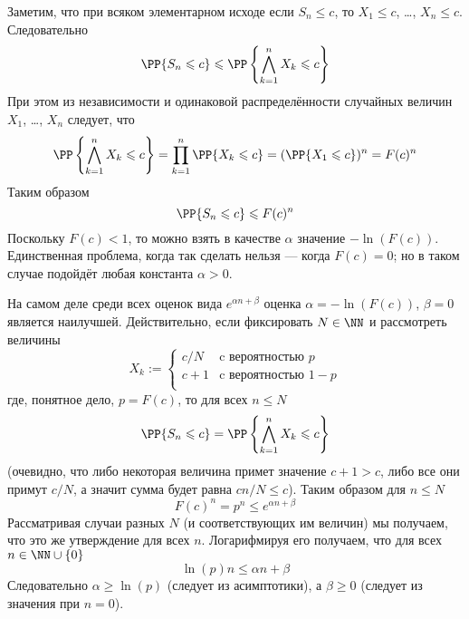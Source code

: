 \documentclass[12pt,a4paper]{article}
\begin{document}
    \begin{enumproblem}
        Заметим, что при всяком элементарном исходе если $S_n \leqslant c$, то $X_1 \leqslant c$, \dots, $X_n \leqslant c$. Следовательно
        \[\PP\{S_n \leqslant c\} \leqslant \PP\left\{\bigwedge_{k=1}^n X_k \leqslant c\right\}\]
        При этом из независимости и одинаковой распределённости случайных величин $X_1$, \dots, $X_n$ следует, что
        \[
            \PP\left\{\bigwedge_{k=1}^n X_k \leqslant c\right\}
            = \prod_{k=1}^n \PP\{X_k \leqslant c\}
            = (\PP\{X_1 \leqslant c\})^n
            = F(c)^n
        \]
        Таким образом
        \[\PP\{S_n \leqslant c\} \leqslant F(c)^n\]
        Поскольку $F(c) < 1$, то можно взять в качестве $\alpha$ значение $-\ln(F(c))$. Единственная проблема, когда так сделать нельзя --- когда $F(c) = 0$; но в таком случае подойдёт любая константа $\alpha > 0$.

        \begin{remark*}
            На самом деле среди всех оценок вида $e^{\alpha n + \beta}$ оценка $\alpha = -\ln(F(c))$, $\beta = 0$ является наилучшей. Действительно, если фиксировать $N \in \NN$ и рассмотреть величины
            \[
                X_k := \begin{cases}
                    c/N& \text{c вероятностью $p$}\\
                    c + 1& \text{c вероятностью $1-p$}\\
                \end{cases}
            \]
            где, понятное дело, $p = F(c)$, то для всех $n \leqslant N$
            \[\PP\{S_n \leqslant c\} = \PP\left\{\bigwedge_{k=1}^n X_k \leqslant c\right\}\]
            (очевидно, что либо некоторая величина примет значение $c+1 > c$, либо все они примут $c/N$, а значит сумма будет равна $cn/N \leqslant c$). Таким образом для $n \leqslant N$
            \[F(c)^n = p^n \leqslant e^{\alpha n + \beta}\]
            Рассматривая случаи разных $N$ (и соответствующих им величин) мы получаем, что это же утверждение для всех $n$. Логарифмируя его получаем, что для всех $n \in \NN \cup \{0\}$
            \[\ln(p) n \leqslant \alpha n + \beta\]
            Следовательно $\alpha \geqslant \ln(p)$ (следует из асимптотики), а $\beta \geqslant 0$ (следует из значения при $n = 0$).
        \end{remark*}
    \end{enumproblem}
\end{document}
